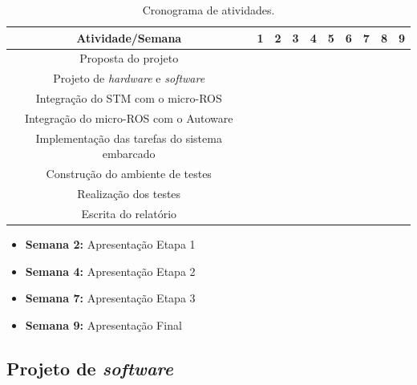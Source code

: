 \begin{table}[H]
	\centering
	\small{
		\begin{tabular}{|c|c|c|c|c|c|c|c|c|c|}
			\hline
			\textbf{Atividade/Semana} & 1 & \textbf{2} & 3 & \textbf{4} & 5 & 6 & \textbf{7} & 8 & \textbf{9} \\
			\hline
			Proposta do projeto  & \cellcolor{unifeiblue} &  &  &  &  &  &  &  &  \\
			\hline
			Projeto de \textit{hardware} e \textit{software}  &  & \cellcolor{unifeiblue} & \cellcolor{unifeiblue} &  &  &  &  &  &  \\
			\hline
			Integração do STM com o micro-ROS  &  & \cellcolor{unifeiblue} &  &  &  &  &  &  &  \\
			\hline
			Integração do micro-ROS com o Autoware  &  &  & \cellcolor{unifeiblue} & \cellcolor{unifeiblue} & \cellcolor{unifeiblue} &  &  &  &  \\
			\hline
			Implementação das tarefas do sistema embarcado  &  &  &  & \cellcolor{unifeiblue} & \cellcolor{unifeiblue} & \cellcolor{unifeiblue} & \cellcolor{unifeiblue} &  &  \\
			\hline
			Construção do ambiente de testes  &  &  &  &  & \cellcolor{unifeiblue} & \cellcolor{unifeiblue} & \cellcolor{unifeiblue} &  &  \\
			\hline
			Realização dos testes  &  &  &  &  &  &  & \cellcolor{unifeiblue} & \cellcolor{unifeiblue} & \cellcolor{unifeiblue} \\
			\hline
			Escrita do relatório  &   & \cellcolor{unifeiblue} & \cellcolor{unifeiblue} & \cellcolor{unifeiblue} & \cellcolor{unifeiblue} & \cellcolor{unifeiblue} & \cellcolor{unifeiblue} & \cellcolor{unifeiblue} & \cellcolor{unifeiblue} \\
			\hline
		\end{tabular}
	}
	\caption{Cronograma de atividades.}
	\label{tab:crono}
\end{table}

\begin{itemize}
	\small
	\item \textbf{Semana 2:} Apresentação Etapa 1
	\item \textbf{Semana 4:} Apresentação Etapa 2
	\item \textbf{Semana 7:} Apresentação Etapa 3
	\item \textbf{Semana 9:} Apresentação Final
\end{itemize}

\clearpage

\subsection{Projeto de \textit{software}}

